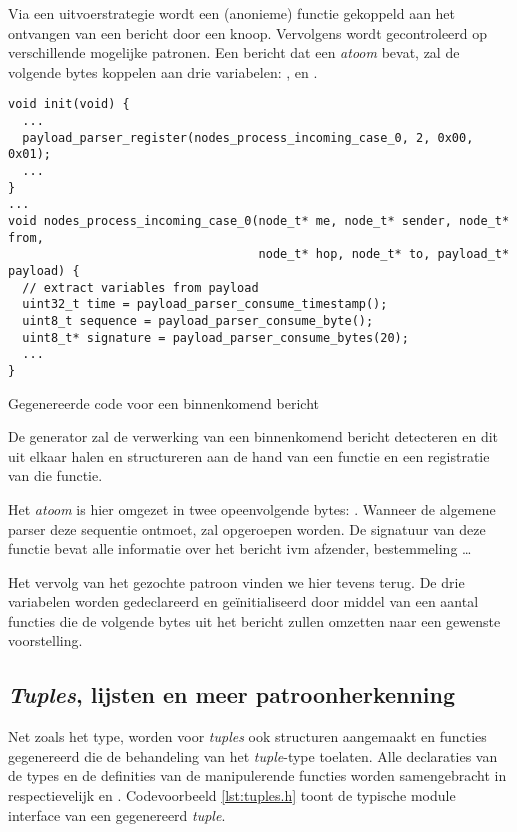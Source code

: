 Via een uitvoerstrategie wordt een (anonieme) functie gekoppeld aan het
ontvangen van een bericht door een knoop. Vervolgens wordt gecontroleerd op
verschillende mogelijke patronen. Een bericht dat een 
\emph{atoom} bevat, zal de volgende bytes koppelen aan drie variabelen:
,  en .

\begin{listing}[ht]
  \begin{verbatim}
void init(void) {
  ...
  payload_parser_register(nodes_process_incoming_case_0, 2, 0x00, 0x01);
  ...
}
...
void nodes_process_incoming_case_0(node_t* me, node_t* sender, node_t* from,
                                   node_t* hop, node_t* to, payload_t* payload) {
  // extract variables from payload
  uint32_t time = payload_parser_consume_timestamp();
  uint8_t sequence = payload_parser_consume_byte();
  uint8_t* signature = payload_parser_consume_bytes(20);
  ...
}
  \end{verbatim}
  \vspace{-5mm}
  \caption{Gegenereerde code voor een binnenkomend bericht}
  \label{lst:comm.c}
\end{listing}

De generator zal de verwerking van een binnenkomend bericht detecteren en dit
uit elkaar halen en structureren aan de hand van een functie en een registratie
van die functie.

Het \emph{atoom} is hier omgezet in twee opeenvolgende bytes: .
Wanneer de algemene parser deze sequentie ontmoet, zal
 opgeroepen worden. De signatuur van
deze functie bevat alle informatie over het bericht ivm afzender,
bestemmeling \dots

Het vervolg van het gezochte patroon vinden we hier tevens terug. De drie
variabelen worden gedeclareerd en ge\"initialiseerd door middel van een aantal
functies die de volgende bytes uit het bericht zullen omzetten naar een
gewenste voorstelling.

\subsection{\emph{Tuples}, lijsten en meer patroonherkenning}

Net zoals het  type, worden voor \emph{tuples} ook structuren
aangemaakt en functies gegenereerd die de behandeling van het \emph{tuple}-type
toelaten. Alle declaraties van de types en de definities van de manipulerende
functies worden samengebracht in respectievelijk  en
. Codevoorbeeld \ref{lst:tuples.h} toont de typische module
interface van een gegenereerd \emph{tuple}.

